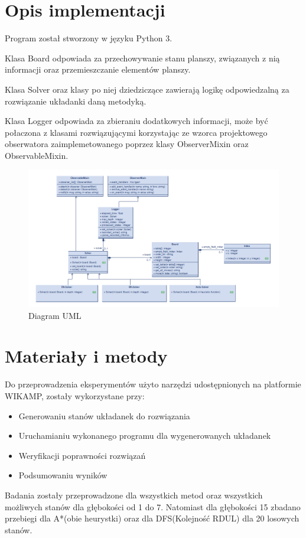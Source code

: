 \documentclass{classrep}
\begin{document}
    \section{Opis implementacji}
    {
        Program został stworzony w języku Python 3.

        Klasa Board odpowiada za przechowywanie stanu planszy, związanych z nią informacji oraz przemieszczanie elementów planszy.

    Klasa Solver oraz klasy po niej dziedziczące zawierają logikę odpowiedzalną za rozwiązanie układanki daną metodyką.

    Klasa Logger odpowiada za zbieraniu dodatkowych informacji, może być połaczona z klasami rozwiązującymi korzystając ze wzorca projektowego obserwatora zaimplemetowanego poprzez klasy ObserverMixin oraz ObservableMixin.

        \begin{figure}[!htb]
            \centering
            \includegraphics[width=\textwidth,height=\textheight,keepaspectratio]{diagram}
            \caption{Diagram UML}
            \label{fig:Diagram UML}
        \end{figure}
     \label{sec:opis-implementacji}}


    \section{Materiały i metody}
    {
        Do przeprowadzenia eksperymentów użyto narzędzi udostępnionych na platformie WIKAMP,
        zostały wykorzystane przy:
        \begin{itemize}
            \item Generowaniu stanów układanek do rozwiązania
            \item Uruchamianiu wykonanego programu dla wygenerowanych układanek
            \item Weryfikacji poprawności rozwiązań
            \item Podsumowaniu wyników
        \end{itemize}
        Badania zostały przeprowadzone dla wszystkich metod oraz wszystkich możliwych stanów dla
        głębokości od 1 do 7. Natomiast dla głębokości 15 zbadano przebiegi dla A*(obie heurystki)
        oraz dla DFS(Kolejność RDUL) dla 20 losowych stanów.
    }\label{sec:materiay-i-metody}
\end{document}
